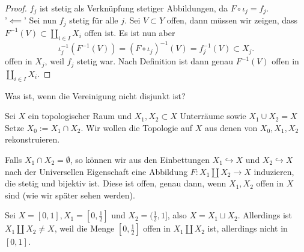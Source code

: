 \begin{proof}
    $f_j$ ist stetig als Verknüpfung stetiger Abbildungen, da  $F \circ  ι_j = f_j$. \\
    '$\impliedby$' Sei nun $f_j$ stetig  für alle $j$. Sei  $V\subset Y$ offen, dann müssen wir zeigen, dass $F^{-1}(V)\subset \coprod_{i \in I}X_i$ offen ist. Es ist nun aber
    \[
        ι_j^{-1} (F^{-1}(V)) = (F \circ  ι_j)^{-1}(V) = f_j^{-1}(V) \subset X_j
    .\] 
    offen in $X_j$, weil $f_j$ stetig war. Nach Definition ist dann genau  $F^{-1}(V)$ offen in $\coprod_{i \in I}X_i$.
\end{proof}

\begin{question}
    Was ist, wenn die Vereinigung nicht disjunkt ist?
\end{question}

Sei $X$ ein topologischer Raum und $X_1,X_2\subset X$ Unterräume sowie $X_1\cup X_2 = X$ Setze $X_0 := X_1\cap X_2$. Wir wollen die Topologie auf $X$ aus denen von  $X_0,X_1,X_2$ rekonstruieren.

\begin{example}
    Falls $X_1\cap X_2=\emptyset$, so können wir aus den Einbettungen $X_1\hookrightarrow  X$ und $X_2\hookrightarrow X$ nach der Universellen Eigenschaft eine Abbildung $F:X_1\coprod X_2 \to  X$ induzieren, die stetig und bijektiv ist. Diese ist offen, genau dann, wenn $X_1,X_2$ offen in $X$ sind (wie wir später sehen werden).
\end{example}

\begin{example}
    Sei $X = [0,1], X_1 = [0,\frac{1}{2}]$ und $X_2 = (\frac{1}{2},1]$, also $X = X_1 \sqcup X_2$. Allerdings ist $X_1 \coprod X_2 \neq X$, weil die Menge $[0,\frac{1}{2}]$ offen in $X_1\coprod X_2$ ist, allerdings nicht in $[0,1]$.
\end{example}

